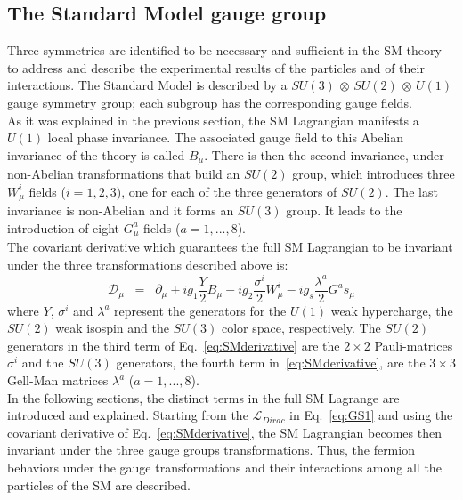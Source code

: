 \subsection{The Standard Model gauge group}\label{sec:gauge group}
Three symmetries are identified to be necessary and sufficient in the SM theory to address and describe the experimental results of the particles and of their interactions. The Standard Model is described by a $SU(3)$ $\otimes$ $SU(2)$ $\otimes$ $U(1)$ gauge symmetry group; each subgroup has the corresponding gauge fields.\\
As it was explained in the previous section, the SM Lagrangian manifests a $U(1)$ local phase invariance. The associated gauge field to this Abelian invariance of the theory is called $B_\mu$. There is then the second invariance, under non-Abelian transformations that build an $SU(2)$ group, which introduces three $W^i_\mu$ fields ($i = 1,2,3$), one for each of the three generators of $SU(2)$. The last invariance is non-Abelian and it forms an $SU(3)$ group. It leads to the introduction of eight $G^a_\mu$ fields ($a = 1,...,8$).\\
The covariant derivative which guarantees the full SM Lagrangian to be invariant under the three transformations described above is:
\begin{equation}
\label{eq:SMderivative}
\mathcal{D}_{\mu} \;\; = \;\; \partial_{\mu} + ig_1\frac{Y}{2}B_{\mu} - ig_2\frac{\sigma^i}{2}W^i_{\mu} - ig_s\frac{\lambda^a}{2}G^as_{\mu}
\end{equation}
where $Y$, $\sigma^i$ and $\lambda^a$ represent the generators for the $U(1)$ weak hypercharge, the $SU(2)$ weak isospin and the $SU(3)$ color space, respectively. The $SU(2)$ generators in the third term of Eq.~\ref{eq:SMderivative} are the $2\times2$ Pauli-matrices $\sigma^i$ and the $SU(3)$ generators, the fourth term in~\ref{eq:SMderivative}, are the $3\times3$ Gell-Man matrices $\lambda^a$ ($a = 1,...,8$).\\

In the following sections, the distinct terms in the full SM Lagrange are introduced and explained. Starting from the $\mathcal{L}_{Dirac}$ in Eq.~\ref{eq:GS1} and using the covariant derivative of Eq.~\ref{eq:SMderivative}, the SM Lagrangian becomes then invariant under the three gauge groups transformations. Thus, the fermion behaviors under the gauge transformations and their interactions among all the particles of the SM  are described. 

